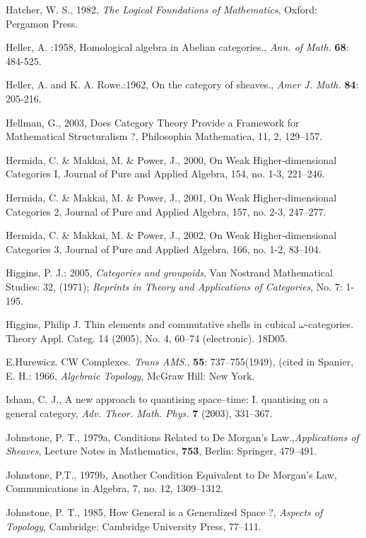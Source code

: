 \documentclass[12pt]{article}
\theoremstyle{plain}
\theoremstyle{definition}
\numberwithin{equation}{section}
\begin{document}
\begin{thebibliography}{9}
Hatcher, W. S., 1982, {\em The Logical Foundations of Mathematics}, Oxford: Pergamon Press. 
  
Heller, A. :1958, Homological algebra in Abelian categories., \emph{Ann. of Math.}
\textbf{68}: 484-525.

Heller, A.  and K. A. Rowe.:1962, On the category of sheaves., \emph{Amer J. Math.}
\textbf{84}: 205-216.

Hellman, G., 2003, Does Category Theory Provide a Framework for Mathematical Structuralism ?, Philosophia Mathematica, 11, 2, 129--157. 

Hermida, C. \& Makkai, M. \& Power, J., 2000, On Weak Higher-dimensional Categories I, Journal of Pure and Applied Algebra, 154, no. 1-3, 221--246. 

Hermida, C. \& Makkai, M. \& Power, J., 2001, On Weak Higher-dimensional Categories 2, Journal of Pure and Applied Algebra, 157, no. 2-3, 247--277.  

Hermida, C. \& Makkai, M. \& Power, J., 2002, On Weak Higher-dimensional Categories 3, Journal of Pure and Applied Algebra, 166, no. 1-2, 83--104.  

Higgins, P. J.: 2005, \emph{Categories and groupoids}, Van Nostrand Mathematical Studies: 32, (1971); \emph{Reprints in
Theory and Applications of Categories}, No. 7: 1-195.

Higgins, Philip J. Thin elements and commutative shells in cubical $\omega$-categories. Theory Appl. Categ. 14 (2005), No. 4, 60--74 (electronic). 18D05.

E.Hurewicz. CW Complexes. {\em Trans AMS}., \textbf{55}: 737--755(1949), (cited in Spanier, E. H.: 1966, {\em Algebraic Topology}, McGraw Hill: New York. 

Isham, C. J., A new approach to quantising space--time: I. quantising on a general category, \emph{Adv. Theor. Math. Phys.} \textbf{7} (2003), 331--367.

Johnstone, P. T., 1979a, Conditions Related to De Morgan's Law.,{\em Applications of Sheaves}, Lecture Notes in Mathematics, \textbf{753}, Berlin: Springer, 479--491. 

Johnstone, P.T., 1979b, Another Condition Equivalent to De Morgan's Law, Communications in Algebra, 7, no. 12, 1309--1312.  

Johnstone, P. T., 1985, How General is a Generalized Space ?, {\em Aspects of Topology}, Cambridge: Cambridge University Press, 77--111. 


\end{thebibliography}
\end{document}
